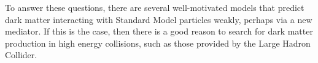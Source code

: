 \par To answer these questions, there are several well-motivated models that predict dark matter interacting with Standard Model particles weakly, perhaps via a new mediator. If this is the case, then there is a good reason to search for dark matter production in high energy collisions, such as those provided by the Large Hadron Collider.
